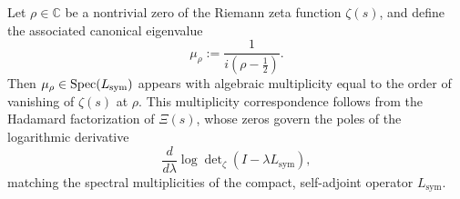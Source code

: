 \begin{lemma}
\label{lem:multiplicity-preservation}
Let \( \rho \in \mathbb{C} \) be a nontrivial zero of the Riemann zeta function \( \zeta(s) \), and define the associated canonical eigenvalue
\[
\mu_\rho := \frac{1}{i(\rho - \tfrac{1}{2})}.
\]
Then \( \mu_\rho \in \operatorname{Spec}(L_{\mathrm{sym}}) \) appears with algebraic multiplicity equal to the order of vanishing of \( \zeta(s) \) at \( \rho \). This multiplicity correspondence follows from the Hadamard factorization of \( \Xi(s) \), whose zeros govern the poles of the logarithmic derivative
\[
\frac{d}{d\lambda} \log \det\nolimits_{\zeta}(I - \lambda L_{\mathrm{sym}}),
\]
matching the spectral multiplicities of the compact, self-adjoint operator \( L_{\mathrm{sym}} \).
\end{lemma}
